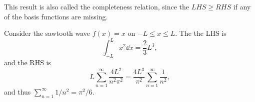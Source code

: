 \documentclass[a4paper]{scrartcl}
\begin{document}
This result is also called the completeness relation, since the $LHS \geq RHS$ if any of the basis functions are missing.

\begin{example}
    Consider the sawtooth wave $f(x) = x$ on $-L \leq x \leq L$. The the LHS is
    $$
    \int_{-L}^{L} x^2 \dd x = \frac{2}{3}L^3,
    $$
    and the RHS is
    $$
    L \sum_{n = 1}^{\infty} \frac{4L^2}{n^2 \pi^2} = \frac{4L^3}{\pi^2}\sum_{n = 1}^{\infty} \frac{1}{n^2},
    $$
    and thus $\sum_{n = 1}^{\infty} 1/n^2 = \pi^2/6$.
\end{example}
\end{document}
